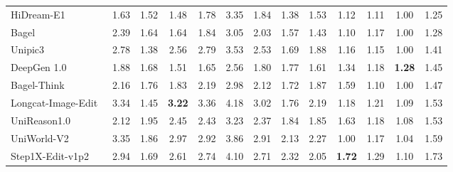 \begin{table}[t]
{\begin{tabular}{l|cccccc|cccccc}
            HiDream-E1~\cite{cai2025hidream}
            & 1.63 & 1.52 & 1.48 & 1.78 & 3.35 & \cellcolor[HTML]{C8C8C8}1.84 & 1.38 & 1.53 & 1.12 & 1.11 & 1.00
            & \cellcolor[HTML]{C8C8C8}1.25 \\

            Bagel~\cite{deng2025emerging}
            & 2.39 & 1.64 & 1.64 & 1.84 & 3.05 & \cellcolor[HTML]{C8C8C8}2.03 & 1.57 & 1.43 & 1.10 & 1.17 & 1.00  
            & \cellcolor[HTML]{C8C8C8}1.28 \\

            Unipic3~\cite{wei2026skywork}
            & 2.78 & 1.38 & 2.56 & 2.79 & 3.53 & \cellcolor[HTML]{C8C8C8}2.53 & 1.69 & 1.88 & 1.16 & 1.15 & 1.00
            & \cellcolor[HTML]{C8C8C8}1.41 \\

            DeepGen 1.0~\cite{wang2026deepgen}
            & 1.88 & 1.68 & 1.51 & 1.65 & 2.56 & \cellcolor[HTML]{C8C8C8}1.80 & 1.77 & 1.61 & 1.34 & 1.18 & \color[HTML]{F88825}\textbf{1.28 }
            & \cellcolor[HTML]{C8C8C8}1.45 \\

            Bagel-Think~\cite{deng2025emerging}
            & 2.16 & 1.76 & 1.83 & 2.19 & 2.98 & \cellcolor[HTML]{C8C8C8}2.12  & 1.72 & 1.87 & 1.59 & 1.10 & 1.00
            & \cellcolor[HTML]{C8C8C8}1.47 \\

            Longcat-Image-Edit~\cite{team2025longcat}
            & 3.34 & 1.45 & \color[HTML]{F88825}\textbf{3.22} & 3.36 & 4.18 & \cellcolor[HTML]{C8C8C8}3.02 & 1.76 & 2.19 & 1.18 & 1.21 & 1.09
            & \cellcolor[HTML]{C8C8C8}1.53 \\

            UniReason1.0~\cite{wang2026unireason}
            & 2.12 & 1.95 & 2.45 & 2.43 & 3.23 & \cellcolor[HTML]{C8C8C8}2.37 & 1.84 & 1.85 & 1.63 & 1.18 & 1.08
            & \cellcolor[HTML]{C8C8C8}1.53 \\

            UniWorld-V2~\cite{li2025uniworld}
            & 3.35 & 1.86 & 2.97 & 2.92 & 3.86 & \cellcolor[HTML]{C8C8C8}2.91 & 2.13 & 2.27 & 1.00 & 1.17 & 1.04
            & \cellcolor[HTML]{C8C8C8}1.59 \\

            Step1X-Edit-v1p2~\cite{liu2025step1x}
            & 2.94 & 1.69 & 2.61 & 2.74 & 4.10 & \cellcolor[HTML]{C8C8C8}2.71 & 2.32 & 2.05 & \color[HTML]{F88825}\textbf{1.72} & 1.29 & 1.10
            & \cellcolor[HTML]{C8C8C8}1.73 \\


\end{tabular}}
\end{table}
